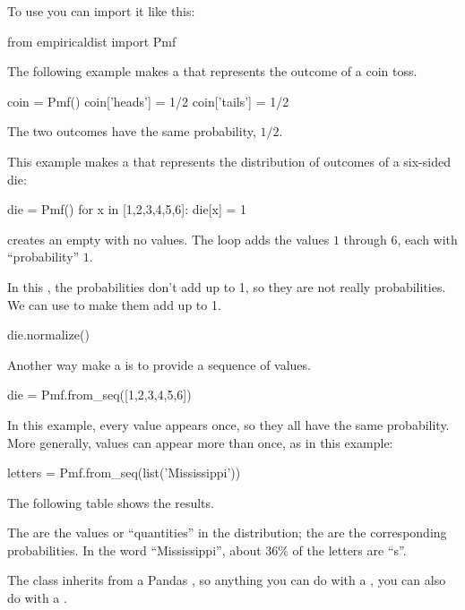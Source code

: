 \documentclass[12pt]{book}
\theoremstyle{exercise}
\begin{document}
To use  you can import it like this:

\begin{code}
from empiricaldist import Pmf
\end{code}

The following example makes a  that represents the outcome of a coin toss.

\begin{code}
coin = Pmf()
coin['heads'] = 1/2
coin['tails'] = 1/2
\end{code}

The two outcomes have the same probability, $1/2$.

This example makes a  that represents the distribution
of outcomes of a six-sided die:

\begin{code}
die = Pmf()
for x in [1,2,3,4,5,6]:
    die[x] = 1
\end{code}

 creates an empty  with no values.  
The  loop adds the values $1$ through $6$, each with ``probability'' $1$.

In this , the probabilities don't add up to 1, so they are not really probabilities.
We can use  to make them add up to 1.

\begin{code}
die.normalize()
\end{code}

Another way make a  is to provide a sequence of values.

\begin{code}
die = Pmf.from_seq([1,2,3,4,5,6])
\end{code}

In this example, every value appears once, so they all have the same probability.
More generally, values can appear more than once, as in this example:

\begin{code}
letters = Pmf.from_seq(list('Mississippi'))
\end{code}

The following table shows the results.



The  are the values or ``quantities'' in the distribution; the  are the corresponding probabilities.  In the word ``Mississippi'', about 36\% of the letters are ``s''.

The  class inherits from a Pandas , so anything you can do with a , you can also do with a .
\end{document}
